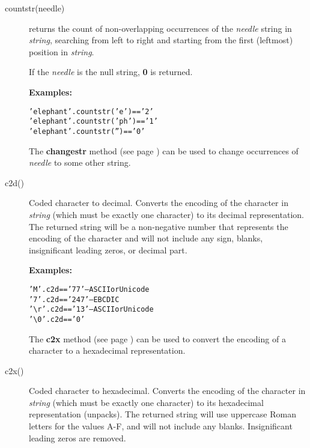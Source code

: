 \begin{description}
\item[countstr(needle)]\label{refcoustr}
returns the count of non-overlapping occurrences of the
\emph{needle} string in \emph{string}, searching from left to
right and starting from the first (leftmost) position in
\emph{string}.
 
If the \emph{needle} is the null string, \textbf{0} is returned.
 
\textbf{Examples:}
\begin{alltt}
'elephant'.countstr('e')  == '2'
'elephant'.countstr('ph') == '1'
'elephant'.countstr('')   == '0'
\end{alltt}
 The  \textbf{changestr} method (see page \pageref{refchastr})  can be used to
change occurrences of \emph{needle} to some other string.
\item[c2d()]\label{refc2d}

Coded character to decimal.
Converts the encoding of the character in \emph{string} (which must be
exactly one character) to its decimal representation.
The returned string will be a non-negative number that represents
the encoding of the character and will not include any sign, blanks,
insignificant leading zeros, or decimal part.
 
\textbf{Examples:}
\begin{alltt}
'M'.c2d  == '77'  -- ASCII or Unicode
'7'.c2d  == '247' -- EBCDIC
'\textbackslash{}r'.c2d == '13'  -- ASCII or Unicode
'\textbackslash{}0'.c2d == '0'
\end{alltt}
 The  \textbf{c2x} method (see page \pageref{refc2x})  can be used to
convert the encoding of a character to a hexadecimal representation.
\item[c2x()]\label{refc2x}

Coded character to hexadecimal.
Converts the encoding of the character in \emph{string} (which must be
exactly one character) to its hexadecimal representation (unpacks).
The returned string will use uppercase Roman letters for the values A-F,
and will not include any blanks.
Insignificant leading zeros are removed.
 

\end{description}
